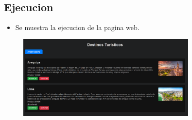\documentclass{article}
\begin{document}
	\subsection{Ejecucion}
    \begin{itemize}
		\item Se muestra la ejecucion de la pagina web.
	\end{itemize}
	\begin{figure}[H]
		\centering
		\includegraphics[width=0.8\textwidth,keepaspectratio]{img/destinos.png}
	\end{figure}

	\clearpage    
			
\end{document}

